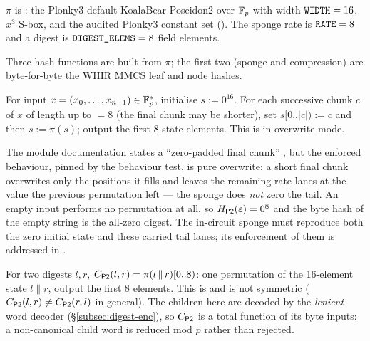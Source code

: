 \begin{definition}[Permutation]
$\pi$ is : the Plonky3 default KoalaBear Poseidon2
over $\mathbb{F}_p$ with width $\texttt{WIDTH}=16$, $x^3$ S-box, and the audited Plonky3
constant set (). The sponge rate is
$\texttt{RATE}=8$ and a digest is $\texttt{DIGEST\_ELEMS}=8$ field elements.
\end{definition}

Three hash functions are built from $\pi$; the first two (sponge and compression)
are byte-for-byte the WHIR MMCS leaf and node hashes.

\begin{definition}
\label{def:sponge}
For input $x=(x_0,\dots,x_{n-1}) \in \mathbb{F}_p^{*}$, initialise $s := 0^{16}$. For each
successive chunk $c$ of $x$ of length up to  $=8$ (the final chunk may be
shorter), set $s[0..|c|) := c$ and then $s := \pi(s)$; output the first $8$ state
elements. This is  in overwrite mode.
\end{definition}

\begin{specdelta}
\label{delta:overwrite}
The module documentation states a ``zero-padded final chunk''
, but the enforced behaviour, pinned by the behaviour test,
is pure overwrite: a short final chunk overwrites only the positions it fills and
leaves the remaining rate lanes at the value the previous permutation left --- the
sponge does \emph{not} zero the tail.
An empty input performs no permutation at all, so $H_{\mathsf{P2}}(\varepsilon)=0^8$ and the
byte hash of the empty string is the all-zero digest.
The in-circuit sponge must reproduce both the zero initial state and these carried
tail lanes; its enforcement of them is addressed in .
\end{specdelta}

\begin{definition}[Compression $\Cp$]
For two digests $l,r$, $C_{\mathsf{P2}}(l,r) = \pi(l \,\|\, r)[0..8)$: one permutation of the
16-element state $l\|r$, output the first $8$ elements. This is
 and is not symmetric
($C_{\mathsf{P2}}(l,r) \ne C_{\mathsf{P2}}(r,l)$ in general).
The children here are decoded by the \emph{lenient} word decoder
(\S\ref{subsec:digest-enc}), so $\Cp$ is a total function of its byte inputs: a
non-canonical child word is reduced mod $p$ rather than rejected.
\end{definition}

